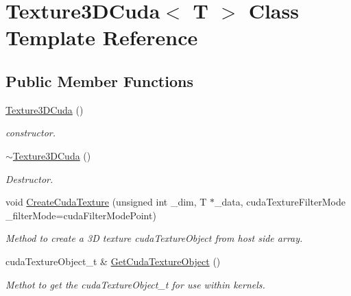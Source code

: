 \hypertarget{classTexture3DCuda}{}\section{Texture3\+D\+Cuda$<$ T $>$ Class Template Reference}
\label{classTexture3DCuda}
\subsection*{Public Member Functions}
\begin{DoxyCompactItemize}
\item 
\hyperlink{classTexture3DCuda_a8eef6ee9a79d890dd330e46725a51a19}{Texture3\+D\+Cuda} ()\hypertarget{classTexture3DCuda_a8eef6ee9a79d890dd330e46725a51a19}{}\label{classTexture3DCuda_a8eef6ee9a79d890dd330e46725a51a19}

\begin{DoxyCompactList}\small\item\em constructor. \end{DoxyCompactList}\item 
\hyperlink{classTexture3DCuda_a0fc6c38fbd700136fa0886453319ca61}{$\sim$\+Texture3\+D\+Cuda} ()\hypertarget{classTexture3DCuda_a0fc6c38fbd700136fa0886453319ca61}{}\label{classTexture3DCuda_a0fc6c38fbd700136fa0886453319ca61}

\begin{DoxyCompactList}\small\item\em Destructor. \end{DoxyCompactList}\item 
void \hyperlink{classTexture3DCuda_ad4a9e8c50f737619d8ee407f00b54b49}{Create\+Cuda\+Texture} (unsigned int \+\_\+dim, T $\ast$\+\_\+data, cuda\+Texture\+Filter\+Mode \+\_\+filter\+Mode=cuda\+Filter\+Mode\+Point)
\begin{DoxyCompactList}\small\item\em Method to create a 3D texture cuda\+Texture\+Object from host side array. \end{DoxyCompactList}\item 
cuda\+Texture\+Object\+\_\+t \& \hyperlink{classTexture3DCuda_afe13d1c4d101b9e48fe0bc47d8cdd087}{Get\+Cuda\+Texture\+Object} ()
\begin{DoxyCompactList}\small\item\em Methot to get the cuda\+Texture\+Object\+\_\+t for use within kernels. \end{DoxyCompactList}\end{DoxyCompactItemize}


